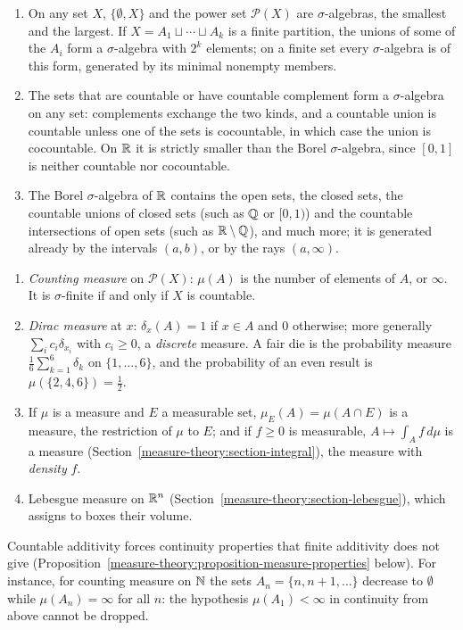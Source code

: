 \begin{example}\label{measure-theory:example-sigma-algebras}
\begin{enumerate}
\item On any set $X$, $\{\emptyset, X\}$ and the power set $\mathcal{P}(X)$ are $\sigma$-algebras, the smallest and the largest. If $X = A_1 \sqcup \cdots \sqcup A_k$ is a finite partition, the unions of some of
the $A_i$ form a $\sigma$-algebra with $2^k$ elements; on a finite set every $\sigma$-algebra is of this form, generated by its minimal nonempty members.
\item The sets that are countable or have countable complement form a $\sigma$-algebra on any set: complements exchange the two kinds, and a countable union is countable unless one of the sets is
cocountable, in which case the union is cocountable. On $\mathbb{R}$ it is strictly smaller than the Borel $\sigma$-algebra, since $[0, 1]$ is neither countable nor cocountable.
\item The Borel $\sigma$-algebra of $\mathbb{R}$ contains the open sets, the closed sets, the countable unions of closed sets (such as $\mathbb{Q}$ or $[0, 1)$) and the countable intersections of open sets (such as
$\mathbb{R} \setminus \mathbb{Q}$), and much more; it is generated already by the intervals $(a, b)$, or by the rays $(a, \infty)$.
\end{enumerate}
\end{example}

\begin{example}\label{measure-theory:example-measures}
\begin{enumerate}
\item \emph{Counting measure} on $\mathcal{P}(X)$: $\mu(A)$ is the number of elements of $A$, or $\infty$. It is $\sigma$-finite if and only if $X$ is countable.
\item \emph{Dirac measure} at $x$: $\delta_x(A) = 1$ if $x \in A$ and $0$ otherwise; more generally $\sum_ic_i\delta_{x_i}$ with $c_i \geq 0$, a \emph{discrete} measure. A fair die is the probability measure
$\frac16\sum_{k=1}^6\delta_k$ on $\{1, \ldots, 6\}$, and the probability of an even result is $\mu(\{2, 4, 6\}) = \frac12$.
\item If $\mu$ is a measure and $E$ a measurable set, $\mu_E(A) = \mu(A \cap E)$ is a measure, the restriction of $\mu$ to $E$; and if $f \geq 0$ is measurable, $A \mapsto \int_Af\,d\mu$ is a measure
(Section~\ref{measure-theory:section-integral}), the measure with \emph{density} $f$.
\item Lebesgue measure on $\mathbb{R}^n$ (Section~\ref{measure-theory:section-lebesgue}), which assigns to boxes their volume.
\end{enumerate}
Countable additivity forces continuity properties that finite additivity does not give (Proposition~\ref{measure-theory:proposition-measure-properties} below). For instance, for counting measure on $\mathbb{N}$ the
sets $A_n = \{n, n + 1, \ldots\}$ decrease to $\emptyset$ while $\mu(A_n) = \infty$ for all $n$: the hypothesis $\mu(A_1) < \infty$ in continuity from above cannot be dropped.
\end{example}

